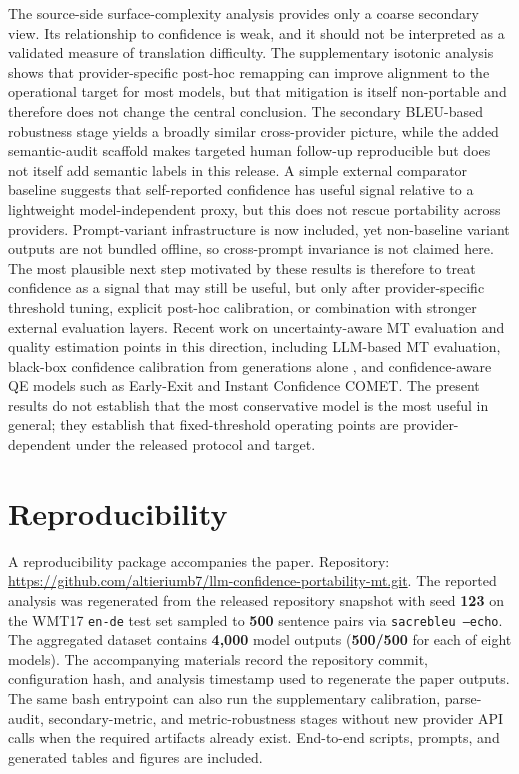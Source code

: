 \documentclass[10pt,conference]{IEEEtran}
\begin{document}
The source-side surface-complexity analysis provides only a coarse secondary view. Its relationship to confidence is weak, and it should not be interpreted as a validated measure of translation difficulty. The supplementary isotonic analysis shows that provider-specific post-hoc remapping can improve alignment to the operational target for most models, but that mitigation is itself non-portable and therefore does not change the central conclusion. The secondary BLEU-based robustness stage yields a broadly similar cross-provider picture, while the added semantic-audit scaffold makes targeted human follow-up reproducible but does not itself add semantic labels in this release. A simple external comparator baseline suggests that self-reported confidence has useful signal relative to a lightweight model-independent proxy, but this does not rescue portability across providers. Prompt-variant infrastructure is now included, yet non-baseline variant outputs are not bundled offline, so cross-prompt invariance is not claimed here. The most plausible next step motivated by these results is therefore to treat confidence as a signal that may still be useful, but only after provider-specific threshold tuning, explicit post-hoc calibration, or combination with stronger external evaluation layers. Recent work on uncertainty-aware MT evaluation and quality estimation points in this direction, including LLM-based MT evaluation, black-box confidence calibration from generations alone \citep{ulmer-etal-2024-calibrating}, and confidence-aware QE models such as Early-Exit and Instant Confidence COMET. The present results do not establish that the most conservative model is the most useful in general; they establish that fixed-threshold operating points are provider-dependent under the released protocol and target.

\section*{Reproducibility}
A reproducibility package accompanies the paper. Repository: \url{https://github.com/altieriumb7/llm-confidence-portability-mt.git}. The reported analysis was regenerated from the released repository snapshot with seed \textbf{123} on the WMT17 \texttt{en-de} test set sampled to \textbf{500} sentence pairs via \texttt{sacrebleu --echo}. The aggregated dataset contains \textbf{4{,}000} model outputs (\textbf{500/500} for each of eight models). The accompanying materials record the repository commit, configuration hash, and analysis timestamp used to regenerate the paper outputs. The same bash entrypoint can also run the supplementary calibration, parse-audit, secondary-metric, and metric-robustness stages without new provider API calls when the required artifacts already exist. End-to-end scripts, prompts, and generated tables and figures are included.
\end{document}
